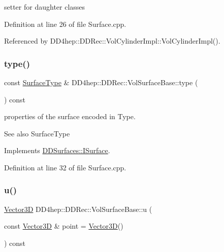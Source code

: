 setter for daughter classes 



Definition at line 26 of file Surface.\+cpp.



Referenced by D\+D4hep\+::\+D\+D\+Rec\+::\+Vol\+Cylinder\+Impl\+::\+Vol\+Cylinder\+Impl().

\hypertarget{class_d_d4hep_1_1_d_d_rec_1_1_vol_surface_base_aa59d5b3c519424448db12c015a95b760}{}\label{class_d_d4hep_1_1_d_d_rec_1_1_vol_surface_base_aa59d5b3c519424448db12c015a95b760} 
\subsubsection{\texorpdfstring{type()}{type()}}
{\footnotesize\ttfamily const \hyperlink{class_d_d_surfaces_1_1_surface_type}{Surface\+Type} \& D\+D4hep\+::\+D\+D\+Rec\+::\+Vol\+Surface\+Base\+::type (\begin{DoxyParamCaption}{ }\end{DoxyParamCaption}) const\hspace{0.3cm}{\ttfamily [virtual]}}

properties of the surface encoded in Type. \begin{DoxySeeAlso}{See also}
Surface\+Type 
\end{DoxySeeAlso}


Implements \hyperlink{class_d_d_surfaces_1_1_i_surface_aab772d11a61d7ae966d535be0da2a626}{D\+D\+Surfaces\+::\+I\+Surface}.



Definition at line 32 of file Surface.\+cpp.

\hypertarget{class_d_d4hep_1_1_d_d_rec_1_1_vol_surface_base_a4eb22902d5caf992589142a93accc48d}{}\label{class_d_d4hep_1_1_d_d_rec_1_1_vol_surface_base_a4eb22902d5caf992589142a93accc48d} 
\subsubsection{\texorpdfstring{u()}{u()}}
{\footnotesize\ttfamily \hyperlink{class_d_d_surfaces_1_1_vector3_d}{Vector3D} D\+D4hep\+::\+D\+D\+Rec\+::\+Vol\+Surface\+Base\+::u (\begin{DoxyParamCaption}\item[{const \hyperlink{class_d_d_surfaces_1_1_vector3_d}{Vector3D} \&}]{point = {\ttfamily \hyperlink{class_d_d_surfaces_1_1_vector3_d}{Vector3D}()} }\end{DoxyParamCaption}) const\hspace{0.3cm}{\ttfamily [virtual]}}

